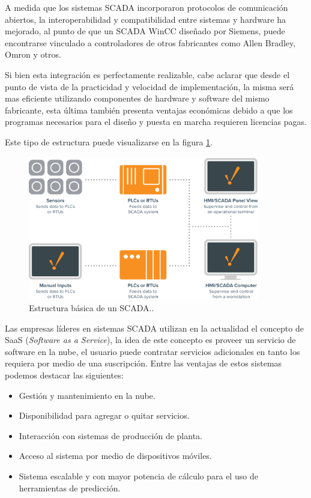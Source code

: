 A medida que los sistemas SCADA incorporaron protocolos de comunicación abiertos, la interoperabilidad y compatibilidad entre sistemas y hardware ha mejorado, al punto de que un SCADA WinCC diseñado por Siemens, puede encontrarse vinculado a controladores de otros fabricantes como Allen Bradley, Omron y otros.

Si bien esta integración es perfectamente realizable, cabe aclarar que desde el punto de vista de la practicidad y velocidad de implementación, la misma será mas eficiente utilizando componentes de hardware y software del mismo fabricante, esta última también presenta ventajas económicas debido a que los programas necesarios para el diseño y puesta en marcha requieren licencias pagas.

Este tipo de estructura puede visualizarse en la figura \ref{fig:SCNOW}.

\begin{figure}[htbp]
	\centering
	\includegraphics[width=0.9\textwidth]{./Figures/BasicSCADA.png}
	\caption{Estructura básica de un SCADA.\protect\footnotemark.}
	\label{fig:SCNOW}
\end{figure}
 
Las empresas líderes en sistemas SCADA utilizan en la actualidad el concepto de SaaS (\textit{Software as a Service}), la idea de este concepto es proveer un servicio de software en la nube, el usuario puede contratar servicios adicionales en tanto los requiera por medio de una suscripción. Entre las ventajas de estos sistemas podemos destacar las siguientes:

\begin{itemize}
	\item Gestión y mantenimiento en la nube.
	\item Disponibilidad para agregar o quitar servicios.
	\item Interacción con sistemas de producción de planta.
	\item Acceso al sistema por medio de dispositivos móviles. 
	\item Sistema escalable y con mayor potencia de cálculo para el uso de herramientas de predicción.
\end{itemize}


